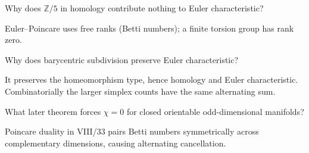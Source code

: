 \begin{problem}\label{prob:viii21-22}
Why does \(\mathbb Z/5\) in homology contribute nothing to Euler characteristic?
\end{problem}
\begin{solution}
Euler--Poincare uses free ranks (Betti numbers); a finite torsion group has rank zero.
\end{solution}

\begin{problem}[Subdivision]\label{prob:viii21-23}
Why does barycentric subdivision preserve Euler characteristic?
\end{problem}
\begin{solution}
It preserves the homeomorphism type, hence homology and Euler characteristic. Combinatorially the larger simplex counts have the same alternating sum.
\end{solution}

\begin{problem}\label{prob:viii21-24}
What later theorem forces \(\chi=0\) for closed orientable odd-dimensional manifolds?
\end{problem}
\begin{solution}
Poincare duality in VIII/33 pairs Betti numbers symmetrically across complementary dimensions, causing alternating cancellation.
\end{solution}
